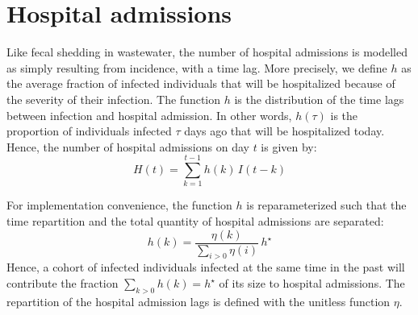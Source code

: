\documentclass[11pt]{article} %
\newcommand{\warning}[1]{\textcolor{RedOrange}{\textbf{#1}}}
\begin{document}
\section{Hospital admissions}

Like fecal shedding in wastewater, the number of hospital admissions is modelled as simply resulting from incidence, with a time lag. 
More precisely, we define $h$ as the average fraction of infected individuals that will be hospitalized because of the severity of their infection. 
The function $h$ is the distribution of the time lags between infection and hospital admission. In other words, $h(\tau)$ is the proportion of individuals infected $\tau$ days ago that will be hospitalized today. 
Hence, the number of hospital admissions on day $t$ is given by:
\begin{equation}
H(t) = \sum_{k=1}^{t-1} h(k) \, I(t-k)
\end{equation}

For implementation convenience, the function $h$ is reparameterized such that the time repartition and the total quantity of hospital admissions are separated:
\begin{equation}
h(k) = \frac{\eta(k)}{\sum_{i>0}\eta(i)} \, h^\star
\end{equation}
Hence, a cohort of infected individuals infected at the same time in the past will contribute the fraction $\sum_{k>0} h(k) =  h^\star$ of its size to hospital admissions. The repartition of the hospital admission lags is defined with the unitless function $\eta$.

%
%
%
%
%
%
\end{document}
